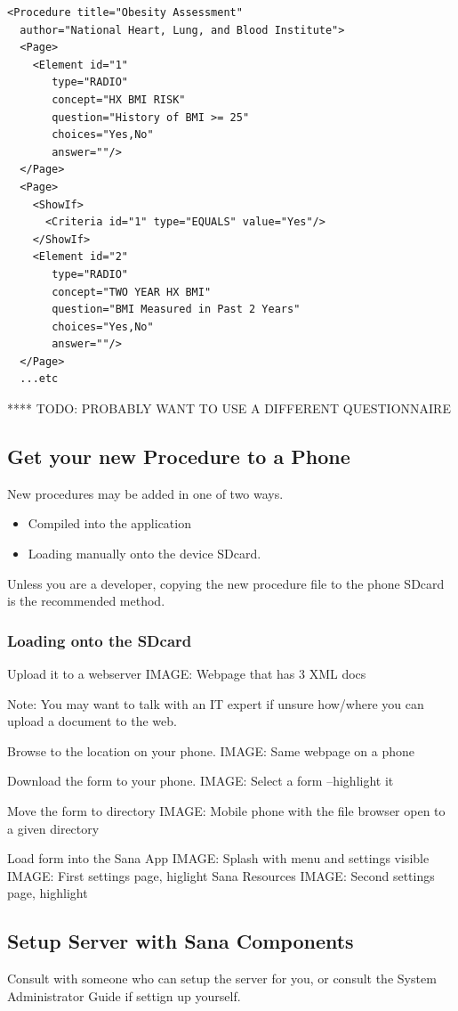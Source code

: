 \documentclass[a4paper,10pt]{article}
\begin{document}
\begin{verbatim}
<Procedure title="Obesity Assessment" 
  author="National Heart, Lung, and Blood Institute">
  <Page>
    <Element id="1"
       type="RADIO" 
       concept="HX BMI RISK"
       question="History of BMI >= 25"
       choices="Yes,No"  
       answer=""/>
  </Page>
  <Page>
    <ShowIf>
      <Criteria id="1" type="EQUALS" value="Yes"/>
    </ShowIf>
    <Element id="2"
       type="RADIO" 
       concept="TWO YEAR HX BMI"
       question="BMI Measured in Past 2 Years"
       choices="Yes,No"  
       answer=""/>
  </Page>
  ...etc
\end{verbatim}

**** TODO: PROBABLY WANT TO USE A DIFFERENT QUESTIONNAIRE


\subsection{Get your new Procedure to a Phone}
New procedures may be added in one of two ways.

\begin{itemize}
 \item Compiled into the application
 \item Loading manually onto the device SDcard.
\end{itemize}
Unless you are a developer, copying the new procedure file to the phone SDcard
is the recommended method.

\subsubsection{Loading onto the SDcard}

Upload it to a webserver 
{IMAGE: Webpage that has 3 XML docs}

Note: You may want to talk with an IT expert if unsure how/where you can upload 
a document to the web.

Browse to the location on your phone.
{IMAGE: Same webpage on a phone}

Download the form to your phone.
{IMAGE: Select a form --highlight it}

Move the form to directory
{IMAGE: Mobile phone with the file browser open to a given directory}

Load form into the Sana App
{IMAGE: Splash with menu and settings visible}
{IMAGE: First settings page, higlight Sana Resources}
{IMAGE: Second settings page, highlight}

\subsection{Setup Server with Sana Components}
Consult with someone who can setup the server for you, or consult the System 
Administrator Guide if settign up yourself. 
\end{document}
